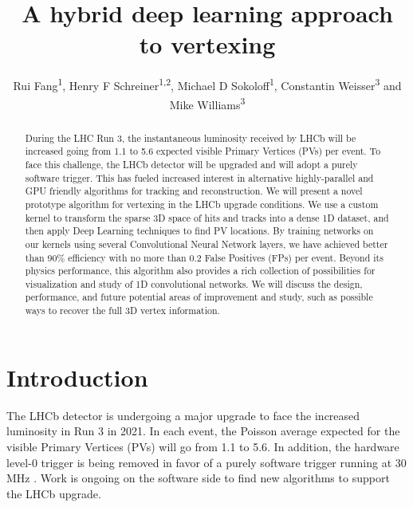 \documentclass[a4paper]{jpconf}
\begin{document}
\title{A hybrid deep learning approach to vertexing}

\author{
   Rui Fang\textsuperscript{1},
   Henry F Schreiner\textsuperscript{1,2},
   Michael D Sokoloff\textsuperscript{1},
   Constantin Weisser\textsuperscript{3} and
   Mike Williams\textsuperscript{3}
}

\address{
    \textsuperscript{1} University of Cincinnati, Cincinnati, OH, United States
}
\address{
    \textsuperscript{2} Princeton University, Princeton, NJ, United States
}
\address{
    \textsuperscript{3} Massachusetts Institute of Technology, Cambridge, MA, United States
}


\begin{abstract}
During the LHC Run 3, the instantaneous luminosity received by LHCb will be increased going from 1.1 to 5.6 expected visible Primary Vertices (PVs) per event. To face this challenge, the LHCb detector will be upgraded and will adopt a purely software trigger.
This has fueled increased interest in alternative highly-parallel and GPU friendly algorithms for tracking and reconstruction. We will present a novel prototype algorithm for vertexing in the LHCb upgrade conditions.
We use a custom kernel to transform the sparse 3D space of hits and tracks into a dense 1D dataset, and then apply Deep Learning techniques to find PV locations. By training networks on our kernels using several Convolutional Neural Network layers, we have achieved better than 90\% efficiency with no more than 0.2 False Positives (FPs) per event. Beyond its physics performance, this algorithm also provides a rich collection of possibilities for visualization and study of 1D convolutional networks. We will discuss the design, performance, and future potential areas of improvement and study, such as possible ways to recover the full 3D vertex information.
\end{abstract}


\section{Introduction}


The LHCb detector is undergoing a major upgrade to face the increased luminosity in Run 3 in 2021.
In each event, the Poisson average expected for the visible Primary Vertices (PVs) will go from 1.1 to 5.6. In addition, the hardware level-0 trigger is being removed in favor of a purely software trigger running at 30 MHz \cite{CERN-LHCC-2014-016}.
Work is ongoing on the software side to find new algorithms to support the LHCb upgrade.
\end{document}
